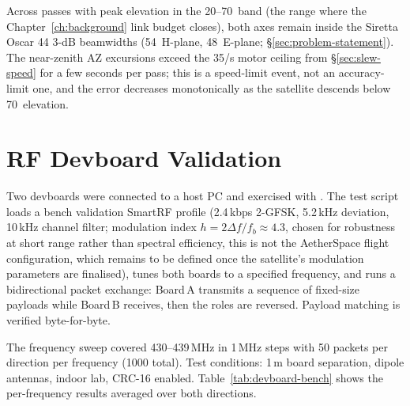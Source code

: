 Across passes with peak elevation in the 20\degree--70\degree\ band (the range where the Chapter~\ref{ch:background} link budget closes), both axes remain inside the Siretta Oscar 44 3-dB beamwidths (54\degree\ H-plane, 48\degree\ E-plane; \S\ref{sec:problem-statement}). The near-zenith AZ excursions exceed the 35\degree/s motor ceiling from \S\ref{sec:slew-speed} for a few seconds per pass; this is a speed-limit event, not an accuracy-limit one, and the error decreases monotonically as the satellite descends below 70\degree\ elevation.

\section{RF Devboard Validation}
\label{sec:rf-measurements}

Two devboards were connected to a host PC and exercised with . The test script loads a bench validation SmartRF profile (2.4\,kbps 2-GFSK, 5.2\,kHz deviation, 10\,kHz channel filter; modulation index $h = 2\Delta f/f_b \approx 4.3$, chosen for robustness at short range rather than spectral efficiency, this is not the AetherSpace flight configuration, which remains to be defined once the satellite's modulation parameters are finalised), tunes both boards to a specified frequency, and runs a bidirectional packet exchange: Board\,A transmits a sequence of fixed-size payloads while Board\,B receives, then the roles are reversed. Payload matching is verified byte-for-byte.

The frequency sweep covered 430--439\,MHz in 1\,MHz steps with 50 packets per direction per frequency (1000 total). Test conditions: 1\,m board separation, dipole antennas, indoor lab, CRC-16 enabled. Table~\ref{tab:devboard-bench} shows the per-frequency results averaged over both directions.

